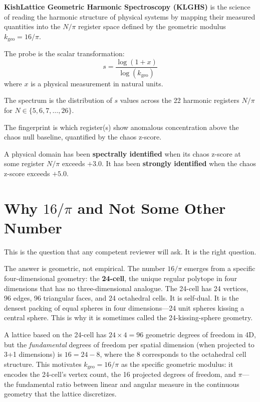 \documentclass[11pt, letterpaper, openany]{book}
\begin{document}
\begin{fieldbox}
\textbf{KishLattice Geometric Harmonic Spectroscopy (KLGHS)} is the science of
reading the harmonic structure of physical systems by mapping their measured
quantities into the $N/\pi$ register space defined by the geometric modulus
$k_\text{geo} = 16/\pi$.

The probe is the scalar transformation:
\[
s = \frac{\log(1 + x)}{\log(k_\text{geo})}
\]
where $x$ is a physical measurement in natural units.

The spectrum is the distribution of $s$ values across the 22 harmonic registers
$N/\pi$ for $N \in \{5, 6, 7, \ldots, 26\}$.

The fingerprint is which register(s) show anomalous concentration above the chaos
null baseline, quantified by the chaos z-score.

A physical domain has been \textbf{spectrally identified} when its chaos
z-score at some register $N/\pi$ exceeds $+3.0$. It has been
\textbf{strongly identified} when the chaos z-score exceeds $+5.0$.
\end{fieldbox}

\section{Why $16/\pi$ and Not Some Other Number}

This is the question that any competent reviewer will ask. It is the right question.

The answer is geometric, not empirical. The number $16/\pi$ emerges from a specific
four-dimensional geometry: the \textbf{24-cell}, the unique regular polytope in
four dimensions that has no three-dimensional analogue. The 24-cell has 24 vertices,
96 edges, 96 triangular faces, and 24 octahedral cells. It is self-dual. It is the
densest packing of equal spheres in four dimensions---24 unit spheres kissing a
central sphere. This is why it is sometimes called the 24-kissing-sphere geometry.

A lattice based on the 24-cell has $24 \times 4 = 96$ geometric degrees of freedom in
4D, but the \emph{fundamental} degrees of freedom per spatial dimension (when
projected to 3+1 dimensions) is $16 = 24 - 8$, where the 8 corresponds to the
octahedral cell structure. This motivates $k_\text{geo} = 16/\pi$ as the specific
geometric modulus: it encodes the 24-cell's vertex count, the 16 projected degrees
of freedom, and $\pi$---the fundamental ratio between linear and angular measure in
the continuous geometry that the lattice discretizes.
\end{document}
